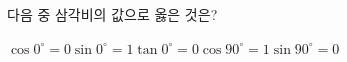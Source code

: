 다음 중 삼각비의 값으로 옳은 것은?
\begin{choices32}{$\cos 0^\circ=0$}{$\sin 0^\circ=1$}{$\tan 0^\circ=0$}{$\cos 90^\circ=1$}{$\sin 90^\circ=0$}\end{choices32}
